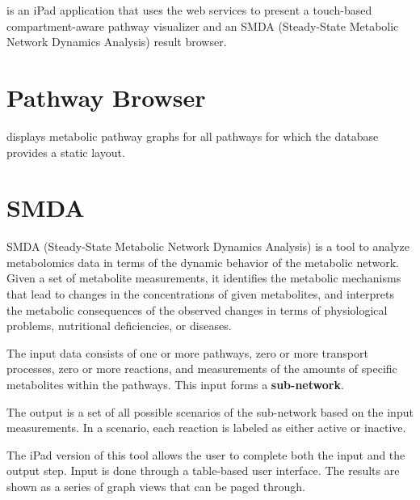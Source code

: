 \mawapp is an iPad application that uses the \pathcasemaw web services to
present a touch-based compartment-aware pathway visualizer and an SMDA
(Steady-State Metabolic Network Dynamics Analysis) result browser.

\section{Pathway Browser}

\mawapp displays metabolic pathway graphs for all pathways for which the
\pathcasemaw database provides a static layout.





\section{SMDA}
\label{sect:smda}

SMDA (Steady-State Metabolic Network Dynamics Analysis) is a tool to analyze
metabolomics data in terms of the dynamic behavior of the metabolic network.
Given a set of metabolite measurements, it identifies the metabolic mechanisms
that lead to changes in the concentrations of given metabolites, and interprets
the metabolic consequences of the observed changes in terms of physiological
problems, nutritional deficiencies, or diseases.

The input data consists of one or more pathways, zero or more transport
processes, zero or more reactions, and measurements of the amounts of specific
metabolites within the pathways. This input forms a \textbf{sub-network}.

The output is a set of all possible scenarios of the sub-network based on the
input measurements. In a scenario, each reaction is labeled as either active or
inactive.

The iPad version of this tool allows the user to complete both the input and
the output step. Input is done through a table-based user interface. The results
are shown as a series of graph views that can be paged through.








